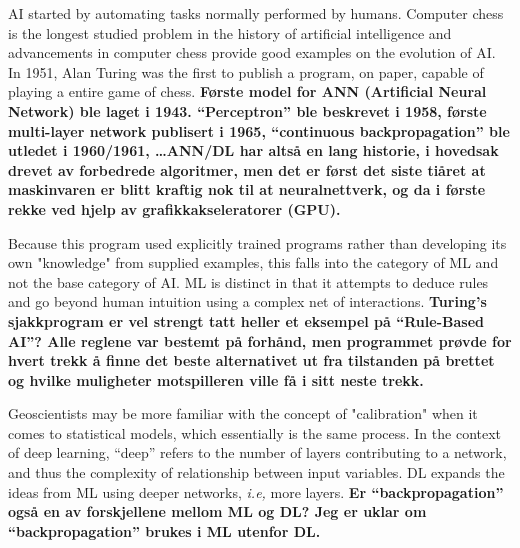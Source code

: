 AI started by automating tasks normally performed by humans. Computer chess is the longest studied problem in the history of artificial intelligence and advancements in computer chess provide good examples on the evolution of AI. In 1951, Alan Turing was the first to publish a program, on paper, capable of playing a entire game of chess. 
\textbf{Første model for ANN (Artificial Neural Network) ble laget i 1943. ``Perceptron'' ble beskrevet i 1958, første multi-layer network publisert i 1965, ``continuous backpropagation'' ble utledet i 1960/1961, \ldots ANN/DL har altså en lang historie, i hovedsak drevet av forbedrede algoritmer, men det er først det siste tiåret at maskinvaren er blitt kraftig nok til at neuralnettverk, og da i første rekke ved hjelp av grafikkakseleratorer (GPU).}

Because this program used explicitly trained programs rather than developing its own "knowledge" from supplied examples, this falls into the category of ML and not the base category of AI. ML is distinct in that it attempts to deduce rules and go beyond human intuition using a complex net of interactions. 
\textbf{Turing's sjakkprogram er vel strengt tatt heller et eksempel på ``Rule-Based AI''? Alle reglene var bestemt på forhånd, men programmet prøvde for hvert trekk å finne det beste alternativet ut fra tilstanden på brettet og hvilke muligheter motspilleren ville få i sitt neste trekk.}

Geoscientists may be more familiar with the concept of "calibration" when it comes to statistical models, which essentially is the same process. In the context of deep learning, ``deep'' refers to the number of layers contributing to a network, and thus the complexity of relationship between input variables. DL expands the ideas from ML using deeper networks, \textit{i.e,} more layers.
\textbf{Er ``backpropagation'' også en av forskjellene mellom ML og DL? Jeg er uklar om ``backpropagation'' brukes i ML utenfor DL.}

